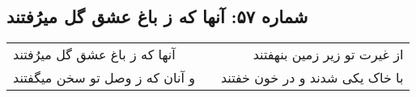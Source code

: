 \begin{center}
\section*{شماره ۵۷: آنها که ز باغ عشق گل میرُفتند}
\label{sec:057}
\begin{longtable}{l p{0.5cm} r}
آنها که ز باغ عشق گل میرُفتند
&&
از غیرت تو زیر زمین بنهفتند
\\
و آنان که ز وصل تو سخن میگفتند
&&
با خاک یکی شدند و در خون خفتند
\\
\end{longtable}
\end{center}
